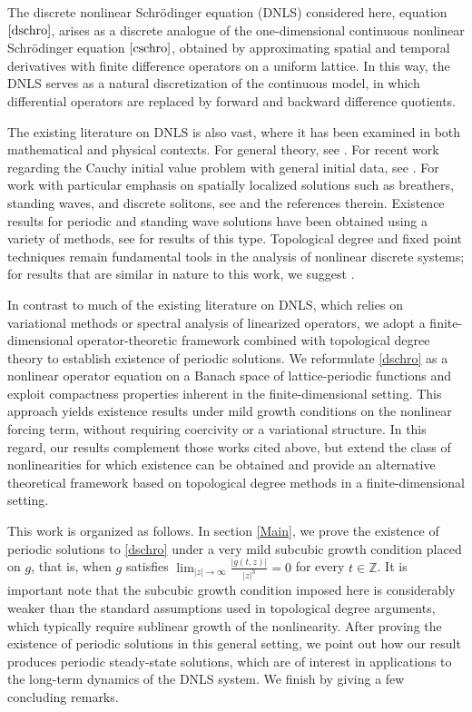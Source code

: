 \documentclass[10pt,a4paper]{amsart}
\newcommand{\Z}{\mathbb{Z}}
\numberwithin{equation}{section}
\begin{document}
{The discrete nonlinear Schr\"odinger equation (DNLS) considered here, equation $\eqref{dschro}$, arises as a discrete analogue of the one-dimensional continuous nonlinear Schr\"odinger equation $\eqref{cschro}$, obtained by approximating spatial and temporal derivatives with finite difference operators on a uniform lattice. In this way, the DNLS serves as a natural discretization of the continuous model, in which differential operators are replaced by forward and backward difference quotients.}

The existing literature on DNLS is also vast, where it has been examined in both mathematical and physical contexts.  For general theory, see \cite{AblowitzLadik,HennigTsironis,Kevrekidis}. {For recent work regarding the Cauchy initial value problem with general initial data, see} \cite{Vuoksenmaa2024}.  For work with particular emphasis on spatially localized solutions such as breathers, standing waves, and discrete solitons, see \cite{Brunhuber,FlachWillis,Flach2003,Zhang2009} and the references therein. Existence results for periodic and standing wave solutions have been obtained using a variety of methods, see \cite{Bak2010,ZhangMa} for results of this type. Topological degree and fixed point techniques remain fundamental tools in the analysis of nonlinear discrete systems; for results that are similar in nature to this work, we suggest \cite{BereanuMawhin, MaroncelliDiscreteBounded, marrod,MaroncelliMult,Rouche}.

In contrast to much of the existing literature on DNLS, which relies on variational methods or spectral analysis of linearized operators, we adopt a finite-dimensional operator-theoretic framework combined with topological degree theory to establish existence of periodic solutions. We reformulate \eqref{dschro} as a nonlinear operator equation on a Banach space of lattice-periodic functions and exploit compactness properties inherent in the finite-dimensional setting. This approach yields existence results under mild growth conditions on the nonlinear forcing term, without requiring coercivity or a variational structure.  {In this regard, our results complement those works cited above, but extend the class of nonlinearities for which existence can be obtained and provide an alternative theoretical framework based on topological degree methods in a finite-dimensional setting.}

This work is organized as follows. In section \ref{Main},  we prove the existence of periodic solutions to \eqref{dschro} under a very mild subcubic growth condition placed on $g$, that is, when $g$ satisfies $\lim_{|z|\to \infty}\frac{|g(t, z)|}{|z|^3}=0$ for every $t\in \Z$.   {It is important note that the subcubic growth condition imposed here is considerably weaker than the standard assumptions used in topological degree arguments, which typically require sublinear growth of the nonlinearity.} After proving the existence of periodic solutions in this general setting, we point out how our result produces periodic steady-state solutions, which are of interest in applications to the long-term dynamics of the DNLS system. We finish by giving a few concluding remarks.
\end{document}
